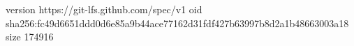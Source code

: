 version https://git-lfs.github.com/spec/v1
oid sha256:fc49d6651ddd0d6e85a9b44ace77162d31fdf427b63997b8d2a1b48663003a18
size 174916
